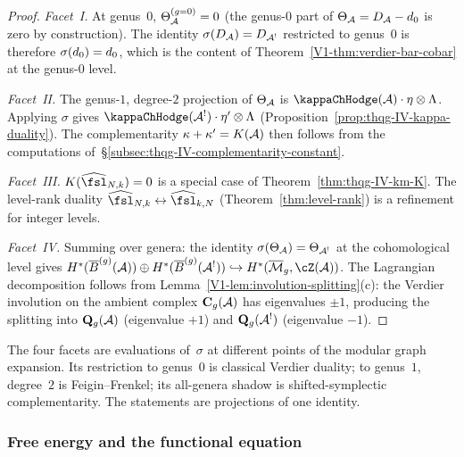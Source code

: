 \begin{proof}
\emph{Facet~I.}
At genus~$0$, $\Theta_{\mathcal{A}}^{(g=0)} = 0$ (the genus-$0$ part of
$\Theta_{\mathcal{A}} = D_{\mathcal{A}} - d_0$ is zero by construction). The identity
$\sigma(D_{\mathcal{A}}) = D_{\mathcal{A}^!}$ restricted to genus~$0$ is therefore
$\sigma(d_0) = d_0$, which is the content of
Theorem~\ref*{V1-thm:verdier-bar-cobar} at the genus-$0$ level.

\emph{Facet~II.}
The genus-$1$, degree-$2$ projection of $\Theta_{\mathcal{A}}$ is
$\kappaChHodge(\cA) \cdot \eta \otimes \Lambda$.
Applying $\sigma$ gives $\kappaChHodge(\cA^!) \cdot \eta' \otimes \Lambda$
(Proposition~\ref{prop:thqg-IV-kappa-duality}).
The complementarity $\kappa + \kappa' = K(\mathcal{A})$ then follows from
the computations of~\S\ref{subsec:thqg-IV-complementarity-constant}.

\emph{Facet~III.}
$K(\widehat{\fsl}_{N,k}) = 0$ is a special case of
Theorem~\ref{thm:thqg-IV-km-K}. The level-rank duality
$\widehat{\fsl}_{N,k} \leftrightarrow \widehat{\fsl}_{k,N}$
(Theorem~\ref{thm:level-rank}) is a refinement for integer levels.

\emph{Facet~IV.}
Summing over genera: the identity $\sigma(\Theta_{\mathcal{A}}) = \Theta_{\mathcal{A}^!}$
at the cohomological level gives
$H^*(\barB^{(g)}(\cA)) \oplus H^*(\barB^{(g)}(\cA^!))
\hookrightarrow H^*(\overline{\cM}_g, \cZ(\cA))$.
The Lagrangian decomposition follows from
Lemma~\ref{V1-lem:involution-splitting}(c): the Verdier involution on
the ambient complex $\mathbf{C}_g(\mathcal{A})$ has eigenvalues $\pm 1$,
producing the splitting into $\mathbf{Q}_g(\mathcal{A})$ (eigenvalue $+1$)
and $\mathbf{Q}_g(\mathcal{A}^!)$ (eigenvalue $-1$).
\end{proof}

\begin{remark}
The four facets are evaluations of~$\sigma$ at different
points of the modular graph expansion. Its restriction to genus~$0$
is classical Verdier duality; to genus~$1$, degree~$2$ is
Feigin--Frenkel; its all-genera shadow is shifted-symplectic
complementarity. The statements are projections of one identity.
\end{remark}

\subsubsection{Free energy and the functional equation}

